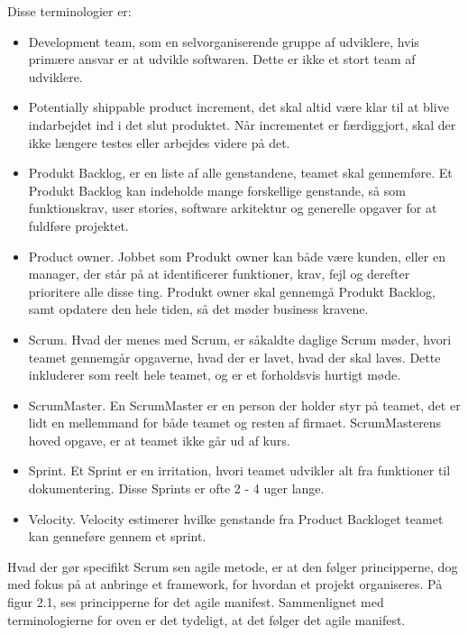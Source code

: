Disse terminologier er:  
\begin{itemize}
    \item Development team, som en selvorganiserende gruppe af udviklere, hvis primære ansvar er at udvikle softwaren. Dette er ikke et stort team af udviklere. 
    
    \item Potentially shippable product increment, det skal altid være klar til at blive indarbejdet ind i det slut produktet. Når incrementet er færdiggjort, skal der ikke længere testes eller arbejdes videre på det.
    
    \item Produkt Backlog, er en liste af alle genstandene, teamet skal gennemføre. Et Produkt Backlog kan indeholde mange forskellige genstande, så som funktionskrav, user stories, software arkitektur og generelle opgaver for at fuldføre projektet. 

    
    \item Product owner. Jobbet som Produkt owner kan både være kunden, eller en manager, der står på at identificerer funktioner, krav, fejl og derefter prioritere alle disse ting. Produkt owner skal gennemgå Produkt Backlog, samt opdatere den hele tiden, så det møder business kravene. 
    
    \item Scrum. Hvad der menes med Scrum, er såkaldte daglige Scrum møder, hvori teamet gennemgår opgaverne, hvad der er lavet, hvad der skal laves. Dette inkluderer som reelt hele teamet, og er et forholdsvis hurtigt møde. 
    
    \item ScrumMaster. En ScrumMaster er en person der holder styr på teamet, det er lidt en mellemmand for både teamet og resten af firmaet. ScrumMasterens hoved opgave, er at teamet ikke går ud af kurs. 
    
    \item Sprint. Et Sprint er en irritation, hvori teamet udvikler alt fra funktioner til dokumentering. Disse Sprints er ofte 2 - 4 uger lange. 
    
    \item Velocity. Velocity estimerer hvilke genstande fra Product Backloget teamet kan genneføre gennem et sprint.
\end{itemize}

Hvad der gør specifikt Scrum sen agile metode, er at den følger principperne, dog med fokus på at anbringe et framework, for hvordan et projekt organiseres. På figur 2.1, ses principperne for det agile manifest. Sammenlignet med terminologierne for oven er det tydeligt, at det følger det agile manifest. \cite{Sommerville} 
 

